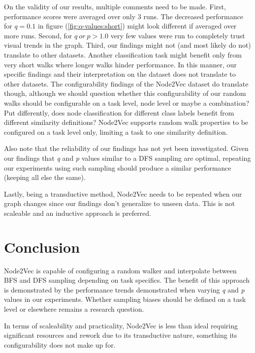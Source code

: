 \documentclass[a4paper,10pt]{article}
\begin{document}
On the validity of our results, multiple comments need to be made. First, performance scores were averaged over only 3 runs. The decreased performance for $q = 0.1$ in figure (\ref{fig:q-values:short}) might look different if averaged over more runs. Second, for $q \ or \ p > 1.0$ very few values were run to completely trust visual trends in the graph. Third, our findings might not (and most likely do not) translate to other datasets. Another classification task might benefit only from very short walks where longer walks hinder performance. In this manner, our specific findings and their interpretation on the dataset does not translate to other datasets. The configurability findings of the Node2Vec dataset do translate though, although we should question whether this configurability of our random walks should be configurable on a task level, node level or maybe a combination? Put differently, does node classification for different class labels benefit from different similarity definitions? Node2Vec supports random walk properties to be configured on a task level only, limiting a task to one similarity definition.

Also note that the reliability of our findings has not yet been investigated. Given our findings that \textit{q} and \textit{p} values similar to a DFS sampling are optimal, repeating our experiments using such sampling should produce a similar performance (keeping all else the same).

Lastly, being a transductive method, Node2Vec needs to be repeated when our graph changes since our findings don't generalize to unseen data. This is not scaleable and an inductive approach is preferred.

\section{Conclusion}

Node2Vec is capable of configuring a random walker and interpolate between BFS and DFS sampling depending on task specifics. The benefit of this approach is demonstrated by the performance trends demonstrated when varying \textit{q} and \textit{p} values in our experiments. Whether sampling biases should be defined on a task level or elsewhere remains a research question.

In terms of scaleability and practicality, Node2Vec is less than ideal requiring significant resources and rework due to its transductive nature, something its configurability does not make up for.
\end{document}
